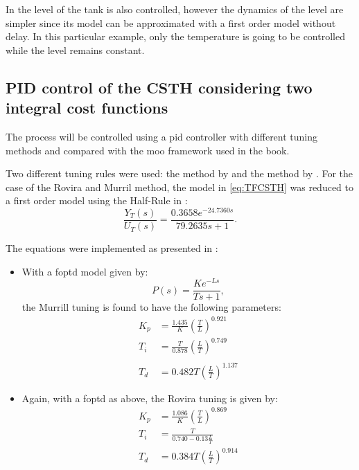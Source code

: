 In \citet{Alfaro2016} the level of the tank is also controlled, however the dynamics of the level are simpler since its model can be approximated with a first order model without delay. In this particular example, only the temperature is going to be controlled while the level remains constant.
%
\subsection{PID control of the CSTH considering two integral cost functions}
\label{sec:PIDCSTH}
The process will be controlled using a \gls{pid} controller with different tuning methods and compared with the \gls{moo} framework used in the book.

Two different tuning rules were used: the method by \citet{Rovira1969a} and the method by \citet{Murril1967}. For the case of the Rovira and Murril method, the model in \eqref{eq:TFCSTH} was reduced to a first order model using the Half-Rule in \citet{Skogestad2003}:
\begin{equation}
\frac{Y_T(s)}{U_T(s)} = \frac{0.3658 e^{-24.7360 s}}{79.2635 s +1}.
\label{eq:TFCSTHFirstOrder}
\end{equation}

The equations were implemented as presented in \citet{odwyer2006}:
\begin{itemize}
	\item With a \gls{foptd} model given by:
			\begin{equation*}
				P(s) = \frac{K e^{-L s}}{Ts+1},
			\end{equation*}
			the Murrill tuning is found to have the following parameters:
				\begin{align*}
					K_p &= \frac{1.435}{K}\left( \frac{T}{L} \right)^{0.921}\\
					T_i &= \frac{T}{0.878}\left( \frac{L}{T}\right)^{0.749}\\\\
					T_d &= 0.482 T \left( \frac{L}{T} \right)^{1.137}
				\end{align*}
	\item Again, with a \gls{foptd} as above, the Rovira tuning is given by:
			\begin{align*}
				K_p &= \frac{1.086}{K} \left( \frac{T}{L}\right) ^{0.869} \\
				T_i &= \frac{T}{0.740 - 0.13\frac{L}{T}} \\
				T_d &= 0.384 T \left( \frac{L}{T}\right)^{0.914} 
			\end{align*}
\end{itemize}

